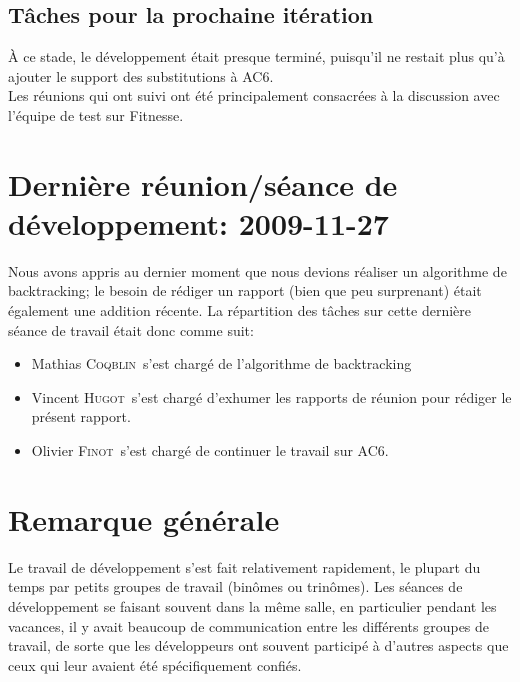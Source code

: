 \documentclass[a4paper,12pt]{article}
\def\familyname{\textsc}
\def\firstname#1{#1}
\def\groupmember#1#2{\firstname{#1} \familyname{#2}}
\def\mmat{\groupmember{Mathias}{Coqblin}}
\def\moli{\groupmember{Olivier}{Finot}}
\def\mvin{\groupmember{Vincent}{Hugot}}
\begin{document}
\subsection{Tâches pour la prochaine itération}

\`A ce stade, le développement était presque terminé, puisqu'il
 ne restait plus qu'à ajouter le support des substitutions à AC6.\mk\\
%
Les réunions qui ont suivi ont été principalement consacrées à
la discussion avec l'équipe de test sur Fitnesse.


\section{Dernière réunion/séance de développement: 2009-11-27}

Nous avons appris au dernier moment que nous devions réaliser 
un algorithme de backtracking; le besoin de rédiger un rapport
(bien que peu surprenant) était également une addition récente.
La répartition des tâches sur cette dernière séance de 
travail était donc comme suit: 
\begin{itemize}
 \item \mmat\ s'est chargé de l'algorithme de backtracking
\item \mvin\ s'est chargé d'exhumer les rapports de réunion pour
rédiger le présent rapport.
\item \moli\ s'est chargé de continuer le travail sur AC6.
\end{itemize}

\section{Remarque générale}

Le travail de développement s'est fait relativement rapidement, 
le plupart du temps par petits groupes de travail (binômes ou trinômes).
Les séances de développement se faisant souvent dans la même salle,
en particulier pendant les vacances,
il y avait beaucoup de communication entre les différents groupes de travail,
de sorte que les développeurs ont souvent 
participé à d'autres aspects que ceux qui leur avaient été spécifiquement
confiés.
\end{document}
